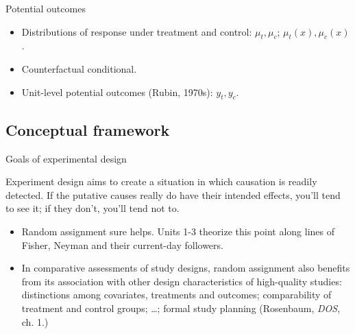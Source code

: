 
\begin{frame}{Potential outcomes}
  
  \begin{itemize}[<+->]
  \item Distributions of response under treatment and control: $\mu_{t},
    \mu_{c}$; $\mu_{t}(x), \mu_{c}(x)$.
  \item Counterfactual conditional.
  \item Unit-level potential outcomes (Rubin, 1970s): $y_{t}, y_{c}$.
  \end{itemize}

\end{frame}
\subsection{Conceptual framework}
\begin{frame}{Goals of experimental design}

Experiment design aims to create a situation in which causation is
readily detected. If the putative causes
really do have their intended effects, you'll tend to see it; if they
don't, you'll tend not to.
\pause

\begin{itemize}[<+->]
\item \textrm{Random
    assignment}  sure helps. Units 1-3 theorize this point along lines
  of Fisher, Neyman and their current-day followers.
\item In comparative assessments of study designs, random assignment also benefits
  from its association with other design characteristics of
  high-quality studies:  distinctions among covariates, treatments and
  outcomes; comparability of treatment and control groups; \ldots;
  formal study planning (Rosenbaum, \textit{DOS}, ch. 1.)
\end{itemize}

\end{frame}

